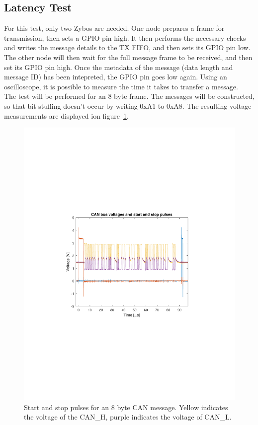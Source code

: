 \subsection{Latency Test}\label{sub:CAN_latency}
For this test, only two Zybos are needed.
One node prepares a frame for transmission, then sets a GPIO pin high.
It then performs the necessary checks and writes the message details to the TX FIFO, and then sets its GPIO pin low. \\

The other node will then wait for the full message frame to be received, and then set its GPIO pin high.
Once the metadata of the message (data length and message ID) has been intepreted, the GPIO pin goes low again.
Using an oscilloscope, it is possible to measure the time it takes to transfer a message.\\

The test will be performed for an 8 byte frame.
The messages will be constructed, so that bit stuffing doesn't occur by writing 0xA1 to 0xA8. 
The resulting voltage measurements are displayed ion figure~\ref{fig:CAN_test1_raw}.\\

\begin{figure}[h]
	\centering
	\includegraphics[width = \linewidth]{graphics/CAN_test1_raw}
	\caption[Start and stop pulses for an 8 byte CAN message.]{Start and stop pulses for an 8 byte CAN message. Yellow indicates the voltage of the CAN\_H, purple indicates the voltage of CAN\_L.}
	\label{fig:CAN_test1_raw}
\end{figure}

